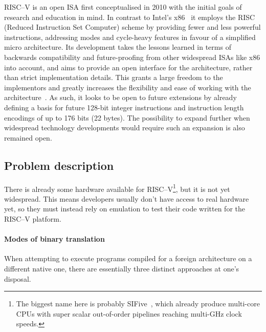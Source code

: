 
RISC--V is an open ISA first conceptualised in 2010 with the initial goals of research and education in mind.
In contrast to Intel's x86~\cite{intel2017man} it employs the RISC (Reduced Instruction Set Computer) scheme by providing fewer and less powerful instructions, addressing modes and cycle-heavy features in favour of a simplified micro architecture.
Its development takes the lessons learned in terms of backwards compatibility and future-proofing from other widespread ISAs like x86 into account, and aims to provide an open interface for the architecture, rather than strict implementation details.
This grants a large freedom to the implementors and greatly increases the flexibility and ease of working with the architecture~\cite[S. 1f]{riscvspec}.
As such, it looks to be open to future extensions by already defining a basis for future 128-bit integer instructions and instruction length encodings of up to 176 bits (22 bytes).
The possibility to expand further when widespread technology developments would require such an expansion is also remained open.


\subsection{Problem description}
There is already some hardware available for RISC--V\footnote{The biggest name here is probably SIFive~\cite{sifive}, which already produce multi-core CPUs with super scalar out-of-order pipelines reaching multi-GHz clock speeds.}, but it is not yet widespread.
This means developers usually don't have access to real hardware yet, so they must instead rely on emulation to test their code written for the RISC--V platform.

\paragraph{Modes of binary translation}
When attempting to execute programs compiled for a foreign architecture on a different native one, there are essentially three distinct approaches at one's disposal.

